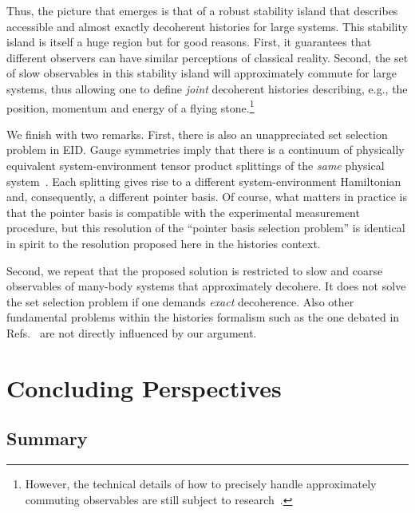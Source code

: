 \documentclass[pre,onecolumn,12pt,aps,longbibliography,nofootinbib]{revtex4-2}
\newcommand{\blue}[1]{#1}
\begin{document}
Thus, the picture that emerges is that of a robust stability island that describes accessible and almost exactly decoherent histories for large systems. This stability island is itself a huge region but for good reasons. First, it guarantees that different observers can have similar perceptions of classical reality. Second, the set of slow observables in this stability island will approximately commute for large systems, thus allowing one to define \emph{joint} decoherent histories describing, e.g., the position, momentum and energy of a flying stone.\footnote{However, the technical details of how to precisely handle approximately commuting observables are still subject to research~\cite{HastingsCMP2009, OgataJFA2013, HalpernEtAlNatComm2016}.}

We finish with two remarks. First, there is also an unappreciated set selection problem in EID. Gauge symmetries imply that there is a continuum of physically equivalent system-environment tensor product splittings of the \emph{same} physical system~\cite{StokesNazirNC2019, StokesNazirRMP2022}. Each splitting gives rise to a different system-environment Hamiltonian and, consequently, a different pointer basis. Of course, what matters in practice is that the pointer basis is compatible with the experimental measurement procedure, but this resolution of the ``pointer basis selection problem'' is identical in spirit to the resolution proposed here in the histories context.

Second, we repeat that the proposed solution is restricted to slow and coarse observables of many-body systems that approximately decohere. It does not solve the set selection problem if one demands \emph{exact} decoherence. Also other fundamental problems within the histories formalism such as the one debated in Refs.~\cite{KentPRL1997, GriffithsHartlePRL1998, KentPRL1998} are not directly influenced by our argument.

\section{Concluding Perspectives}
\label{sec perspectives}

\subsection{\blue{Summary}}
\end{document}
